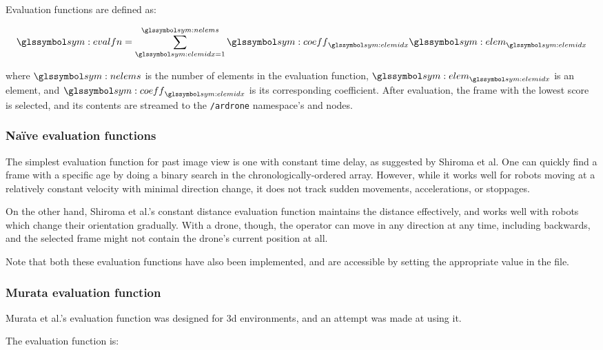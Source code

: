     Evaluation functions are defined as:

    \begin{equation}
      \sym{evalfn} = \sum_{\sym{elemidx}=1}^{\sym{nelems}}{\sym{coeff}_{\sym{elemidx}}\sym{elem}_{\sym{elemidx}}}
    \end{equation}
    
    where $\sym{nelems}$ is the number of elements in the evaluation function, $\sym{elem}_{\sym{elemidx}}$ is an element, and $\sym{coeff}_{\sym{elemidx}}$ is its corresponding coefficient.
    After evaluation, the frame with the lowest score is selected, and its contents are streamed to the \texttt{/ardrone} namespace's \texttt{} and \texttt{} nodes.

    \subsubsection{Naïve evaluation functions}
      The simplest evaluation function for past image view is one with constant time delay, as suggested by Shiroma et al.\cite{shiroma2004}
      One can quickly find a frame with a specific age by doing a binary search in the chronologically-ordered array.
      However, while it works well for robots moving at a relatively constant velocity with minimal direction change, it does not track sudden movements, accelerations, or stoppages.

      On the other hand, Shiroma et al.'s constant distance evaluation function\cite{shiroma2004} maintains the distance effectively, and works well with robots which change their orientation gradually.
      With a drone, though, the operator can move in any direction at any time, including backwards, and the selected frame might not contain the drone's current position at all.

      Note that both these evaluation functions have also been implemented, and are accessible by setting the appropriate value in the \texttt{} file.

    \subsubsection{Murata evaluation function}
      Murata et al.'s evaluation function was designed for \gls{3d} environments,\cite{murata2014} and an attempt was made at using it.

      The evaluation function is:


